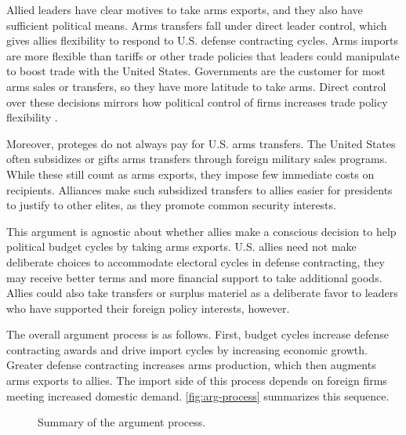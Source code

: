\documentclass[12pt]{article}
\begin{document}
Allied leaders have clear motives to take arms exports, and they also have sufficient political means. 
Arms transfers fall under direct leader control, which gives allies flexibility to respond to U.S. defense contracting cycles.
Arms imports are more flexible than tariffs or other trade policies that leaders could manipulate to boost trade with the United States.
Governments are the customer for most arms sales or transfers, so they have more latitude to take arms.
Direct control over these decisions mirrors how political control of firms increases trade policy flexibility \citep{Davisetal2019}.


Moreover, proteges do not always pay for U.S. arms transfers.
The United States often subsidizes or gifts arms transfers through foreign military sales programs. 
While these still count as arms exports, they impose few immediate costs on recipients.
Alliances make such subsidized transfers to allies easier for presidents to justify to other elites, as they promote common security interests. 


This argument is agnostic about whether allies make a conscious decision to help political budget cycles by taking arms exports.
U.S. allies need not make deliberate choices to accommodate electoral cycles in defense contracting, they may receive better terms and more financial support to take additional goods. 
Allies could also take transfers or surplus materiel as a deliberate favor to leaders who have supported their foreign policy interests, however. 


The overall argument process is as follows.
First, budget cycles increase defense contracting awards and drive import cycles by increasing economic growth. 
Greater defense contracting increases arms production, which then augments arms exports to allies.
The import side of this process depends on foreign firms meeting increased domestic demand.
\autoref{fig:arg-process} summarizes this sequence.


\begin{figure}[htpb]
\caption{Summary of the argument process.}
\label{fig:arg-process}
\end{figure}
\end{document}
